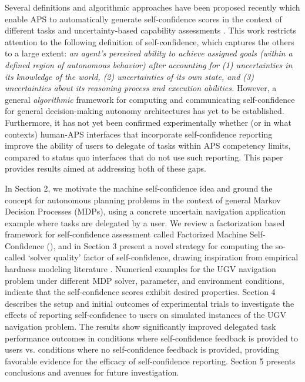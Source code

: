 Several definitions and algorithmic approaches have been proposed recently which enable APS to automatically generate self-confidence scores in the context of different tasks and uncertainty-based capability assessments \cite{Sweet2016-tz, Israelsen2017-ym}. This work restricts attention to the following definition of self-confidence, which captures the others to a large extent: \textit{an agent's perceived ability to achieve assigned goals (within a defined region of autonomous behavior) after accounting for (1) uncertainties in its knowledge of the world, (2) uncertainties of its own state, and (3) uncertainties about its reasoning process and execution abilities.} However, a general \emph{algorithmic} framework for computing and communicating self-confidence for general decision-making autonomy architectures has yet to be established. Furthermore, it has not yet been confirmed experimentally whether (or in what contexts) human-APS interfaces that incorporate self-confidence reporting improve the ability of users to delegate of tasks within APS competency limits, compared to status quo interfaces that do not use such reporting. This paper provides results aimed at addressing both of these gaps. 


In Section 2, we motivate the machine self-confidence idea and ground the concept for autonomous planning problems in the context of general Markov Decision Processes (MDPs), using a concrete uncertain navigation application example where tasks are delegated by a user. We review a factorization based framework for self-confidence assessment called Factorized Machine Self-Confidence (\famsec), and in Section 3 present a novel strategy for computing the so-called `solver quality' factor of self-confidence, drawing inspiration from empirical hardness modeling literature \cite{Leyton-Brown2009-yr}. Numerical examples for the UGV navigation problem under different MDP solver, parameter, and environment conditions, indicate that the self-confidence scores exhibit desired properties. Section 4 describes the setup and initial outcomes of experimental trials to investigate the effects of reporting self-confidence to users on simulated instances of the UGV navigation problem. The results show significantly improved delegated task performance outcomes in conditions where self-confidence feedback is provided to users vs. conditions where no self-confidence feedback is provided, providing favorable evidence for the efficacy of self-confidence reporting. Section 5 presents conclusions and avenues for future investigation. %


